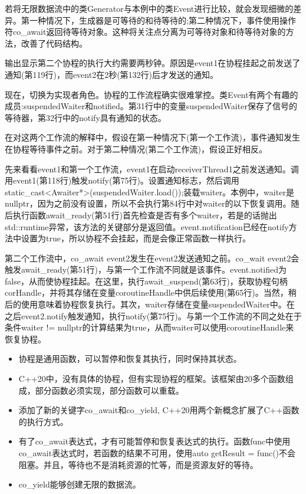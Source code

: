 若将无限数据流中的类Generator与本例中的类Event进行比较，就会发现细微的差异。第一种情况下，生成器是可等待的和待等待的;第二种情况下，事件使用操作符co\_await返回待等待对象。这种将关注点分离为可等待对象和待等待对象的方法，改善了代码结构。

输出显示第二个协程的执行大约需要两秒钟。原因是event1在协程挂起之前发送了通知(第119行)，而event2在2秒(第132行)后才发送的通知。

现在，切换为实现者角色。协程的工作流程确实很难掌控。类Event有两个有趣的成员:suspendedWaiter和notified。第31行中的变量suspendedWaiter保存了信号的等待器，第32行中的notify具有通知的状态。

在对这两个工作流的解释中，假设在第一种情况下(第一个工作流)，事件通知发生在协程等待事件之前。对于第二种情况(第二个工作流)，假设正好相反。

先来看看event1和第一个工作流，event1在启动receiverThread1之前发送通知。调用event1(第118行)触发notify(第75行)。设置通知标志，然后调用static\_cast<Awaiter*>(suspendedWaiter.load());装载waiter。本例中，waiter是nullptr，因为之前没有设置，所以不会执行第84行中对waiter的以下恢复调用。随后执行函数await\_ready(第51行)首先检查是否有多个waiter，若是的话抛出std::runtime异常，该方法的关键部分是返回值。event.notification已经在notify方法中设置为true，所以协程不会挂起，而是会像正常函数一样执行。

第二个工作流中，co\_await event2发生在event2发送通知之前。co\_wait event2会触发await\_ready(第51行)，与第一个工作流不同就是该事件。event.notified为false，从而使协程挂起。在这里，执行await\_suspend(第63行)，获取协程句柄corHandle，并将其存储在变量coroutineHandle中供后续使用(第65行)。当然，稍后的使用意味着协程恢复执行。其次，waiter存储在变量suspendedWaiter中。在之后event2.notify触发通知，执行notify(第75行)。与第一个工作流的不同之处在于条件waiter != nullptr的计算结果为true，从而waiter可以使用coroutineHandle来恢复协程。

\begin{tcolorbox}[breakable,enhanced jigsaw,colback=mygreen!5!white,colframe=mygreen!75!black,title={总结}]
	
\begin{itemize}
\item 
协程是通用函数，可以暂停和恢复其执行，同时保持其状态。

\item 
C++20中，没有具体的协程，但有实现协程的框架。该框架由20多个函数组成，部分函数必须实现，部分函数可以重载。

\item 
添加了新的关键字co\_await和co\_yield, C++20用两个新概念扩展了C++函数的执行方式。

\item 
有了co\_await表达式，才有可能暂停和恢复表达式的执行。函数func中使用co\_await表达式时，若函数的结果不可用，使用auto getResult = func()不会阻塞。并且，等待也不是消耗资源的忙等，而是资源友好的等待。

\item 
co\_yield能够创建无限的数据流。

\end{itemize}

\end{tcolorbox}

